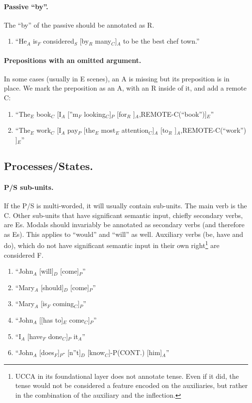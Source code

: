 \documentclass[11pt]{article}
\newcommand{\be}{\begin{enumerate}}
\newcommand{\ee}{\end{enumerate}}
\begin{document}
\paragraph{
Passive ``by''.} The ``by'' of the passive should be annotated as R.
\be \item
``He$_A$ is$_F$ considered$_S$ [by$_R$ many$_C$]$_A$ to be the best chef town.''
\ee

\paragraph{
Prepositions with an omitted argument.} In some cases (usually in E scenes), an A is missing but its preposition is in place. We mark the preposition as an A, with an R inside of it, and add a remote C:
\be \item
``The$_E$ book$_C$ [I$_A$ [''m$_F$ looking$_C$]$_P$ [for$_R$ ]$_A$,REMOTE-C(``book'')]$_E$''
\item
``The$_E$ work$_C$ [I$_A$ pay$_P$ [the$_E$ most$_E$ attention$_C$]$_A$ [to$_R$ ]$_A$,REMOTE-C(``work'') ]$_E$''
\ee

\subsection*{Processes/States.}

\paragraph{
P/S sub-units.} If the P/S is multi-worded, it will usually contain sub-units. The main verb is the C. Other sub-units that have significant semantic input, chiefly secondary verbs, are Es. Modals should invariably be annotated as secondary verbs (and therefore as Es). This applies to ``would'' and ``will'' as well. Auxiliary verbs (be, have and do), which do not have significant semantic input in their own right\footnote{UCCA in its foundational layer does not annotate tense. Even if it did, the tense would not be considered a feature encoded on the auxiliaries, but rather in the combination of the auxiliary and the inflection.} are considered F.
\be \item
``John$_A$ [will]$_D$ [come]$_P$''
\item
``Mary$_A$ [should]$_D$ [come]$_P$''
\item
``Mary$_A$ [is$_F$ coming$_C$]$_P$''
\item
``John$_A$ [[has to]$_E$ come$_C$]$_P$''
\item
``I$_A$ [have$_F$ done$_C$]$_P$ it$_A$''
\item
``John$_A$ [does$_F$]$_P$- [n''t]$_D$ [know$_C$]-P(CONT.) [him]$_A$''
\ee
\end{document}

